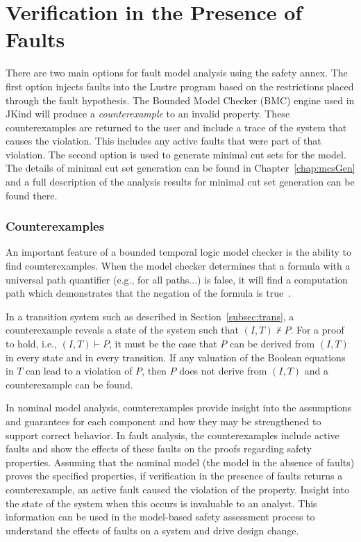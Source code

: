 \section{Verification in the Presence of Faults}
\label{sec:analysisResults}
There are two main options for fault model analysis using the safety annex. The first option injects faults into the Lustre program based on the restrictions placed through the fault hypothesis. The Bounded Model Checker (BMC) engine used in JKind will produce a {\em counterexample} to an invalid property. These counterexamples are returned to the user and include a trace of the system that causes the violation. This includes any active faults that were part of that violation. The second option is used to generate minimal cut sets for the model. The details of minimal cut set generation can be found in Chapter~\ref{chap:mcsGen} and a full description of the analysis results for minimal cut set generation can be found there. 

\subsubsection{Counterexamples}
An important feature of a bounded temporal logic model checker is the ability to find counterexamples. When the model checker determines that a formula with a universal path quantifier (e.g., for all paths...) is false, it will find a computation path which demonstrates that the negation of the formula is true~\cite{clarke2018model}. 

In a transition system such as described in Section~\ref{subsec:trans}, a counterexample reveals a state of the system such that $(I, T) \not \vdash P$. For a proof to hold, i.e., $(I, T) \vdash P$, it must be the case that $P$ can be derived from $(I,T)$ in every state and in every transition. If any valuation of the Boolean equations in $T$ can lead to a violation of $P$, then $P$ does not derive from $(I,T)$ and a counterexample can be found. 

In nominal model analysis, counterexamples provide insight into the assumptions and guarantees for each component and how they may be strengthened to support correct behavior. In fault analysis, the counterexamples include active faults and show the effects of these faults on the proofs regarding safety properties. Assuming that the nominal model (the model in the absence of faults) proves the specified properties, if verification in the presence of faults returns a counterexample, an active fault caused the violation of the property. Insight into the state of the system when this occurs is invaluable to an analyst. This information can be used in the model-based safety assessment process to understand the effects of faults on a system and drive design change. 

